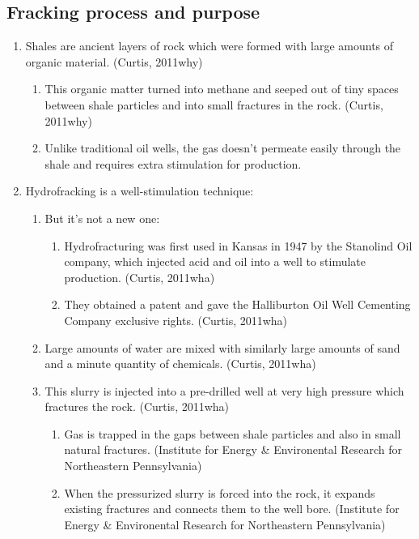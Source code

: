 \documentclass{article}
\begin{document}
  \subsection{Fracking process and purpose}
    \begin{enumerate}
      \item Shales are ancient layers of rock which were formed with large amounts of organic material. (Curtis, 2011why)
        \begin{enumerate}
          \item This organic matter turned into methane and seeped out of tiny spaces between shale particles and into small fractures in the rock. (Curtis, 2011why)
          \item Unlike traditional oil wells, the gas doesn't permeate easily through the shale and requires extra stimulation for production.
        \end{enumerate}
      \item Hydrofracking is a well-stimulation technique:
        \begin{enumerate}
          \item But it's not a new one:
            \begin{enumerate}
              \item Hydrofracturing was first used in Kansas in 1947 by the Stanolind Oil company, which injected acid and oil into a well to stimulate production. (Curtis, 2011wha)
              \item They obtained a patent and gave the Halliburton Oil Well Cementing Company exclusive rights. (Curtis, 2011wha)
            \end{enumerate}
          \item Large amounts of water are mixed with similarly large amounts of sand and a minute quantity of chemicals. (Curtis, 2011wha)
          \item This slurry is injected into a pre-drilled well at very high pressure which fractures the rock. (Curtis, 2011wha)
            \begin{enumerate}
              \item Gas is trapped in the gaps between shale particles and also in small natural fractures. (Institute for Energy \& Environental Research for Northeastern Pennsylvania)
              \item When the pressurized slurry is forced into the rock, it expands existing fractures and connects them to the well bore. (Institute for Energy \& Environental Research for Northeastern Pennsylvania)

\end{enumerate}
\end{enumerate}
\end{enumerate}
\end{document}
